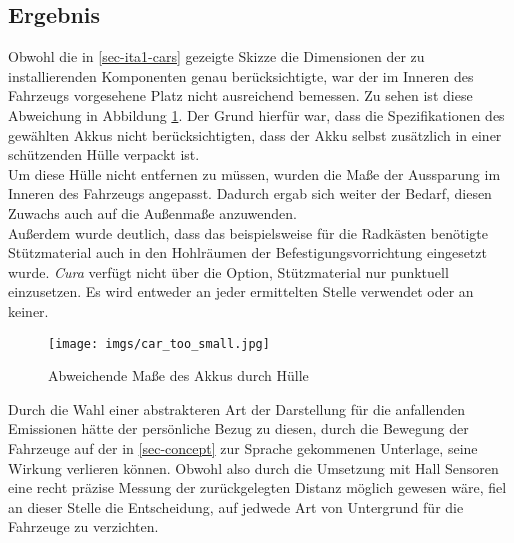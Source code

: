 \documentclass[.../Dokumentation.tex]{subfiles}
\begin{document}
\subsection{Ergebnis}\label{sec-ita1-result}
Obwohl die in \ref{sec-ita1-cars} gezeigte Skizze die Dimensionen der zu 
installierenden Komponenten genau berücksichtigte, war der im Inneren des 
Fahrzeugs vorgesehene Platz nicht ausreichend bemessen.
Zu sehen ist diese Abweichung in Abbildung \ref{fig-car-too-small}.
Der Grund hierfür war, dass die Spezifikationen des gewählten Akkus nicht 
berücksichtigten, dass der Akku selbst zusätzlich in einer schützenden Hülle 
verpackt ist.\\
Um diese Hülle nicht entfernen zu müssen, wurden die 
Maße der Aussparung im Inneren des Fahrzeugs angepasst. Dadurch ergab 
sich weiter der Bedarf, diesen Zuwachs auch auf die Außenmaße anzuwenden.\\
Außerdem wurde deutlich, dass das beispielsweise für die Radkästen benötigte 
Stützmaterial auch in den Hohlräumen der Befestigungsvorrichtung 
eingesetzt wurde. \textit{Cura} verfügt nicht über die Option, Stützmaterial nur 
punktuell einzusetzen. Es wird entweder an jeder ermittelten Stelle verwendet 
oder an keiner. 
\begin{figure}[H]
    \begin{center}
    \texttt{[image: imgs/car\_too\_small.jpg]}
    \caption{Abweichende Maße des Akkus durch Hülle}
    \label{fig-car-too-small}
    \end{center}
\end{figure}
\noindent
Durch die Wahl einer abstrakteren Art der Darstellung für die anfallenden 
Emissionen hätte der persönliche Bezug zu diesen, durch die Bewegung der 
Fahrzeuge auf der in \ref{sec-concept} zur Sprache gekommenen Unterlage, seine 
Wirkung verlieren können. Obwohl also durch die Umsetzung mit Hall Sensoren 
eine recht präzise Messung der zurückgelegten Distanz möglich gewesen wäre, 
fiel an dieser Stelle die Entscheidung, auf jedwede Art von Untergrund 
für die Fahrzeuge zu verzichten.
\end{document}
